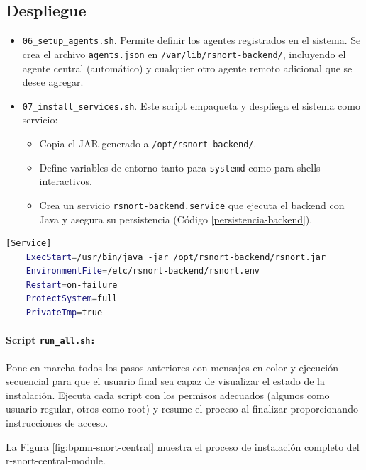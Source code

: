\documentclass[11pt,a4paper,twoside]{report}
\begin{document}
\subsection*{Despliegue}

\begin{itemize}
	\item \texttt{06\_setup\_agents.sh}. Permite definir los agentes registrados en el sistema. Se crea el archivo \texttt{agents.json} en \texttt{/var/lib/rsnort-backend/}, incluyendo el agente central (automático) y cualquier otro agente remoto adicional que se desee agregar.
	
	\item \texttt{07\_install\_services.sh}. Este script empaqueta y despliega el sistema como servicio:
	\begin{itemize}
		\item Copia el JAR generado a \texttt{/opt/rsnort-backend/}.
		\item Define variables de entorno tanto para \texttt{systemd} como para shells interactivos.
		\item Crea un servicio \texttt{rsnort-backend.service} que ejecuta el backend con Java y asegura su persistencia (Código \ref{persistencia-backend}).
	\end{itemize}
\end{itemize}


\begin{lstlisting}[language=bash, caption={Fragmento del servicio systemd para el backend.}, label={persistencia-backend}]
	[Service]
	ExecStart=/usr/bin/java -jar /opt/rsnort-backend/rsnort.jar
	EnvironmentFile=/etc/rsnort-backend/rsnort.env
	Restart=on-failure
	ProtectSystem=full
	PrivateTmp=true
\end{lstlisting}

\paragraph{Script \texttt{run\_all.sh:}} Pone en marcha todos los pasos anteriores con mensajes en color y ejecución secuencial para que el usuario final sea capaz de visualizar el estado de la instalación. Ejecuta cada script con los permisos adecuados (algunos como usuario regular, otros como root) y resume el proceso al finalizar proporcionando instrucciones de acceso.

\newpage

La Figura \ref{fig:bpmn-snort-central} muestra el proceso de instalación completo del r-snort-central-module.
\end{document}
